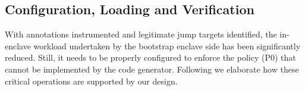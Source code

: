 






\subsection{Configuration, Loading and Verification}
\label{subsec:verify}

With annotations instrumented and legitimate jump targets identified, the in-enclave workload undertaken by the bootstrap enclave side has been significantly reduced. Still, it needs to be properly configured to enforce the policy (P0) that cannot be implemented by the code generator.
Following we elaborate how these critical operations are supported by our design.



